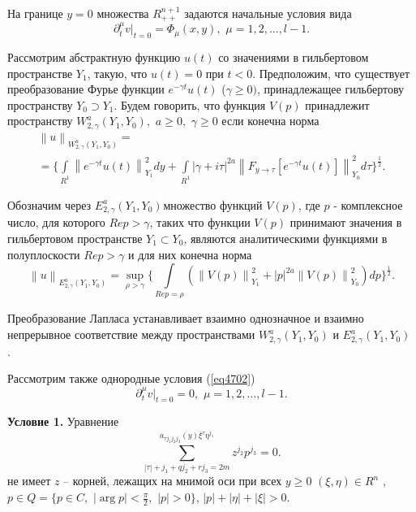 На границе $y = 0$ множества $R_{ + + }^{n + 1} $ задаются начальные условия
вида
\begin{equation}
\label{eq4702}
\partial _t^\mu \left. v \right|_{t = 0} = \Phi _\mu (x,y),\,\,\mu =
1,2,...,l - 1.
\end{equation}



Рассмотрим абстрактную функцию $u(t)$ со значениями в ги\-ль\-бе\-р\-то\-вом
пространстве $Y_1 $, такую, что $u(t) = 0$ при $t < 0$. Предположим, что
существует преобразование Фурье функции $e^{ - \gamma t}u(t)$ ($\gamma \ge
0)$, принадлежащее гильбертову пространству $Y_0 \supset Y_1 $. Будем
говорить, что функция $V(p)$ принадлежит пространству $W_{2,\gamma }^a (Y_1
,Y_0 ),\,\,a \ge 0,\,\,\gamma \ge 0$ если конечна норма
\begin{multline*}
\left\| u \right\|_{W_{2,\gamma }^a (Y_1 ,Y_0 )} =
\\=
\{\int\limits_{R^1}
{\left\| {e^{ - \gamma t}u(t)} \right\|_{Y_1 }^2 dy} + \int\limits_{R^1}
{\left| {\gamma + i\tau } \right|^{2a}\left\| {F_{y \to \tau } [e^{ - \gamma
t}u(t)]} \right\|_{Y_0 }^2 d\tau \}^{\frac{1}{2}}} .
\end{multline*}



Обозначим через $E_{2,\gamma }^a (Y_1 ,Y_0 )_{ }$множество функций $V(p)$,
где $p$ - комплексное число, для которого $Rep > \gamma $, таких что функции
$V(p)$ принимают значения в гильбертовом пространстве $Y_1 \subset Y_0 $,
являются аналитическими функциями в полуплоскости $Rep > \gamma $ и для них
конечна норма
\[
\left\| u \right\|_{E_{2,\gamma }^a (Y_1 ,Y_0 )} = \mathop {\sup
}\limits_{\rho > \gamma } \{\int\limits_{Rep = \rho } {(\left\| {V(p)}
\right\|_{Y_1 }^2 + \left| p \right|^{2a}\left\| {V(p)} \right\|_{Y_0 }^2
)dp} \}^{\frac{1}{2}}.
\]

Преобразование Лапласа устанавливает взаимно однозначное и взаимно
непрерывное соответствие между пространствами $W_{2,\gamma }^a (Y_1 ,Y_0 )$
и $E_{2,\gamma }^a (Y_1 ,Y_0 )$ .

Рассмотрим также однородные условия (\ref{eq4702})
\begin{equation}
\label{eq4703}
\partial _t^\mu \left. v \right|_{t = 0} = 0,\,\,\mu = 1,2,...,l - 1.
\end{equation}



\textbf{Условие 1.} Уравнение
\begin{equation}
\label{eq4704}
\sum\limits_{\left| \tau \right| + j_1 + qj_2 + rj_3 = 2m}^ {a_{\tau j_1 j_2
j_3 } (y)\xi ^\tau \eta ^{j_1 }} z^{j_2 }p^{j_3 } = 0.
\end{equation}
не имеет $z$ -- корней, лежащих на мнимой оси при всех $y \ge 0\,\,(\xi
,\eta ) \in R^n\,\,$, $p \in Q = \{p \in C,\,\,\left| {\arg p} \right| <
\frac{\pi }{2},\,\,\left| p \right| > 0\}$, $\left| p \right| + \left| \eta
\right| + \left| \xi \right| > 0$.

